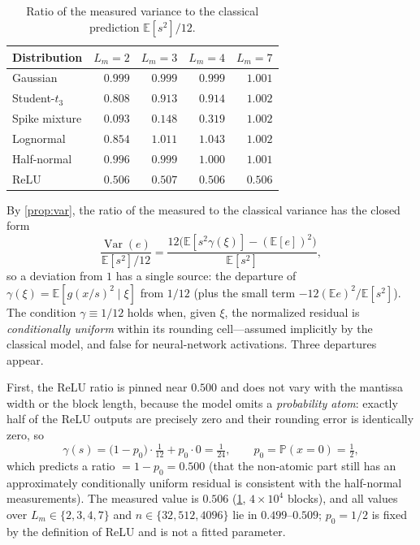 \documentclass[review,hidelinks,oneeqnum,onetabnum,onefignum,onethmnum]{siamart251216}
\begin{document}
\begin{table}[!tb]
\centering
\caption{Ratio of the measured variance to the classical prediction
$\mathbb{E}[s^2]/12$.}
\label{tab:var}
\small
\begin{tabular}{@{}lrrrr@{}}
\toprule
Distribution & $L_m=2$ & $L_m=3$ & $L_m=4$ & $L_m=7$ \\
\midrule
Gaussian           & $0.999$ & $0.999$ & $0.999$ & $1.001$ \\
Student-$t_3$      & $0.808$ & $0.913$ & $0.914$ & $1.002$ \\
Spike mixture      & $\mathbf{0.093}$ & $\mathbf{0.148}$ & $\mathbf{0.319}$ & $1.002$ \\
Lognormal          & $0.854$ & $1.011$ & $1.043$ & $1.002$ \\
Half-normal        & $0.996$ & $0.999$ & $1.000$ & $1.001$ \\
ReLU               & $\mathbf{0.506}$ & $\mathbf{0.507}$ & $\mathbf{0.506}$ & $\mathbf{0.506}$ \\
\bottomrule
\end{tabular}
\end{table}

By \cref{prop:var}, the ratio of the measured to the classical variance has the
closed form
\begin{equation}
\frac{\operatorname{Var}(e)}{\mathbb{E}[s^2]/12}
=\frac{12\bigl(\mathbb{E}[s^2\gamma(\xi)]-(\mathbb{E}[e])^2\bigr)}{\mathbb{E}[s^2]} ,
\label{eq:ratio}
\end{equation}
so a deviation from $1$ has a single source: the departure of
$\gamma(\xi)=\mathbb{E}[g(x/s)^2\mid\xi]$ from $1/12$ (plus the small term
$-12(\mathbb{E}e)^2/\mathbb{E}[s^2]$). The condition $\gamma\equiv1/12$ holds
when, given $\xi$, the normalized residual is \emph{conditionally uniform}
within its rounding cell---assumed implicitly by the classical model, and false
for neural-network activations. Three departures appear.

First, the ReLU ratio is pinned near $0.500$ and does not vary with the mantissa
width or the block length, because the model omits a \emph{probability atom}:
exactly half of the ReLU outputs are precisely zero and their rounding error is
identically zero, so
\begin{equation}
\gamma(s)=\bigl(1-p_0\bigr)\cdot\tfrac1{12}+p_0\cdot 0=\tfrac1{24},
\qquad p_0=\mathbb{P}(x=0)=\tfrac12 ,
\label{eq:atom}
\end{equation}
which predicts a ratio $=1-p_0=0.500$ (that the non-atomic part still has an
approximately conditionally uniform residual is consistent with the half-normal
measurements). The measured value is $0.506$ (\cref{tab:var},
$4\times10^4$ blocks), and all values over $L_m\in\{2,3,4,7\}$ and
$n\in\{32,512,4096\}$ lie in $0.499$--$0.509$; $p_0=1/2$ is fixed by the
definition of ReLU and is not a fitted parameter.
\end{document}
